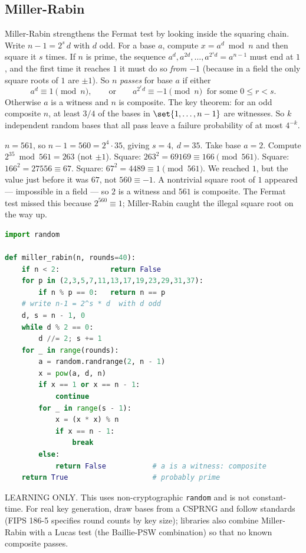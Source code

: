 \subsection{Miller-Rabin}
\label{ch40:millerrabin}

Miller-Rabin strengthens the Fermat test by looking inside the squaring chain. Write $n-1 =
2^{s}\,d$ with $d$ odd. For a base $a$, compute $x = a^d \bmod n$ and then square it $s$ times. If
$n$ is prime, the sequence $a^d, a^{2d}, \dots, a^{2^s d}=a^{n-1}$ must end at $1$, and the first time
it reaches $1$ it must do so \emph{from} $-1$ (because in a field the only square roots of $1$ are
$\pm 1$). So $n$ \emph{passes} for base $a$ if either
\[
  a^d \equiv 1 \pmod n,\qquad\text{or}\qquad a^{2^r d}\equiv -1\pmod n\ \text{ for some }0\le r<s.
\]
Otherwise $a$ is a witness and $n$ is composite. The key theorem: for an odd composite $n$, at least
$3/4$ of the bases in $\set{1,\dots,n-1}$ are witnesses. So $k$ independent random bases that all
pass leave a failure probability of at most $4^{-k}$.

\begin{example}
\label{ch40:ex-mr}
$n=561$, so $n-1 = 560 = 2^4\cdot 35$, giving $s=4,\ d=35$. Take base $a=2$. Compute $2^{35}\bmod
561 = 263$ (not $\pm 1$). Square: $263^2 = 69169 \equiv 166\pmod{561}$. Square: $166^2 = 27556\equiv
67$. Square: $67^2 = 4489\equiv 1\pmod{561}$. We reached $1$, but the value just before it was $67$,
not $560\equiv -1$. A nontrivial square root of $1$ appeared --- impossible in a field --- so $2$ is a
witness and $561$ is composite. The Fermat test missed this because $2^{560}\equiv 1$; Miller-Rabin
caught the illegal square root on the way up.
\end{example}

\begin{implementbox}
\begin{lstlisting}[language=Python]
import random

def miller_rabin(n, rounds=40):
    if n < 2:            return False
    for p in (2,3,5,7,11,13,17,19,23,29,31,37):
        if n % p == 0:   return n == p
    # write n-1 = 2^s * d  with d odd
    d, s = n - 1, 0
    while d % 2 == 0:
        d //= 2; s += 1
    for _ in range(rounds):
        a = random.randrange(2, n - 1)
        x = pow(a, d, n)
        if x == 1 or x == n - 1:
            continue
        for _ in range(s - 1):
            x = (x * x) % n
            if x == n - 1:
                break
        else:
            return False           # a is a witness: composite
    return True                    # probably prime
\end{lstlisting}
LEARNING ONLY. This uses non-cryptographic \texttt{random} and is not constant-time. For real key
generation, draw bases from a CSPRNG and follow standards (FIPS 186-5 specifies round counts by key
size); libraries also combine Miller-Rabin with a Lucas test (the Baillie-PSW combination) so that no
known composite passes.
\end{implementbox}


